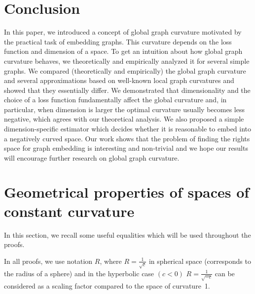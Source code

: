 \documentclass{article} %
\begin{document}
\section{Conclusion}

In this paper, we introduced a concept of global graph curvature motivated by the practical task of embedding graphs. This curvature depends on the loss function and dimension of a space. To get an intuition about how global graph curvature behaves, we theoretically and empirically analyzed it for several simple graphs. We compared (theoretically and empirically) the global graph curvature and several approximations based on well-known local graph curvatures and showed that they essentially differ. We demonstrated that dimensionality and the choice of a loss function fundamentally affect the global curvature and, in particular, when dimension is larger the optimal curvature usually becomes less negative, which agrees with our theoretical analysis. We also proposed a simple dimension-specific estimator which decides whether it is reasonable to embed into a negatively curved space. Our work shows that the problem of finding the rights space for graph embedding is interesting and non-trivial and we hope our results will encourage further research on global graph curvature.





\appendix

\section{Geometrical properties of spaces of constant curvature}\label{sec:properties}

In this section, we recall some useful equalities which will be used throughout the proofs.

In all proofs, we use notation $R$, where $R = \frac{1}{\sqrt{c}}$ in spherical space (corresponds to the radius of a sphere) and in the hyperbolic case $(c < 0)$ $R = \frac{1}{\sqrt{-c}}$ can be considered as a scaling factor compared to the space of curvature~1.
\end{document}
